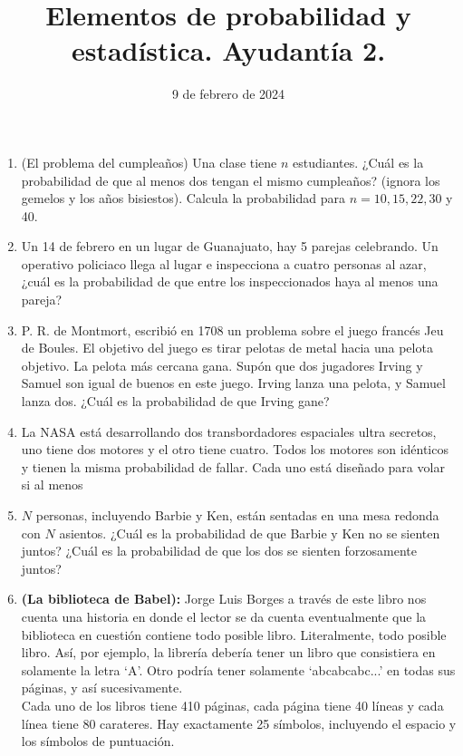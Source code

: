 \documentclass{article}
\title{Elementos de probabilidad y estadística. Ayudantía 2.}
\date{9 de febrero de 2024}
\begin{document}
\maketitle


\begin{enumerate}
    \item (El problema del cumpleaños) Una clase tiene $n$ estudiantes. ¿Cuál es la
    probabilidad de que al menos dos tengan el mismo cumpleaños? (ignora los gemelos
    y los años bisiestos). Calcula la probabilidad para $n=10,15,22,30$ y 40.

    \item Un 14 de febrero en un lugar de Guanajuato, hay 5 parejas celebrando.
    Un operativo policiaco llega al lugar e inspecciona a cuatro personas al azar,
    ¿cuál es la probabilidad de que entre los inspeccionados haya al menos una pareja?

    \item P. R. de Montmort, escribió en 1708 un problema sobre el juego francés
    Jeu de Boules.  El objetivo del juego es  tirar pelotas de metal hacia una pelota 
    objetivo.  La pelota más cercana gana.  Supón que dos jugadores Irving y Samuel son igual
    de buenos en este juego. Irving lanza una pelota, y Samuel lanza dos. ¿Cuál es la
    probabilidad de que Irving gane?

    \item La NASA está desarrollando dos transbordadores espaciales ultra secretos,
    uno tiene dos motores y el otro tiene cuatro.  Todos los motores son idénticos 
    y tienen la misma probabilidad de fallar.  Cada uno está diseñado para volar si 
    al menos 
    \item $N$ personas, incluyendo Barbie y Ken, están sentadas en una mesa redonda con $N$ asientos. 
    ¿Cuál es la probabilidad de que Barbie y Ken no se sienten juntos? ¿Cuál es la probabilidad de que los dos 
    se sienten forzosamente juntos?
    \item \textbf{(La biblioteca de Babel):} Jorge Luis Borges a través de este libro nos cuenta una historia en donde 
    el lector se da cuenta eventualmente que la biblioteca en cuestión contiene todo posible libro. Literalmente, todo posible libro. 
    Así, por ejemplo, la librería debería tener un libro que consistiera en solamente la letra `A'. Otro podría 
    tener solamente `abcabcabc...' en todas sus páginas, y así sucesivamente.\\

    Cada uno de los libros tiene 410 páginas, cada página tiene 40 líneas y cada línea tiene 80 carateres. 
    Hay exactamente 25 símbolos, incluyendo el espacio y los símbolos de puntuación. \\


\end{enumerate}
\end{document}
